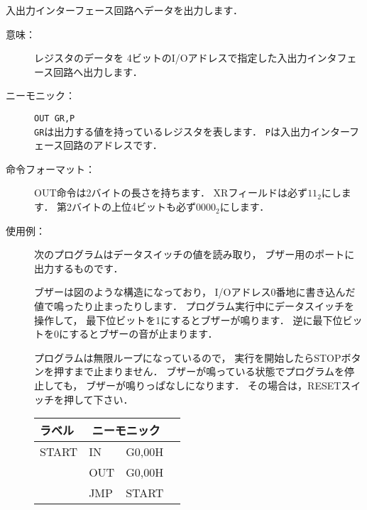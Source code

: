 入出力インターフェース回路へデータを出力します．

\begin{description}
\item[意味：]レジスタのデータを
4ビットのI/Oアドレスで指定した入出力インタフェース回路へ出力します．

\item[ニーモニック：]{\tt OUT  GR,P} \\
{\tt GR}は出力する値を持っているレジスタを表します．
{\tt P}は入出力インターフェース回路のアドレスです．

\item[命令フォーマット：]OUT命令は2バイトの長さを持ちます．
XRフィールドは必ず$11_2$にします．
第2バイトの上位4ビットも必ず$0000_2$にします．


\item[使用例：]
次のプログラムはデータスイッチの値を読み取り，
ブザー用のポートに出力するものです．

ブザーは図のような構造になっており，
I/Oアドレス0番地に書き込んだ値で鳴ったり止まったりします．
プログラム実行中にデータスイッチを操作して，
最下位ビットを1にするとブザーが鳴ります．
逆に最下位ビットを0にするとブザーの音が止まります．

プログラムは無限ループになっているので，
実行を開始したらSTOPボタンを押すまで止まりません．
ブザーが鳴っている状態でプログラムを停止しても，
ブザーが鳴りっぱなしになります．
その場合は，RESETスイッチを押して下さい．

{\tt\small\begin{center}
\begin{tabular}{|l|l l|l}
\cline{1-3}
ラベル & \multicolumn{2}{|c|}{ニーモニック} \\
\hline
START & IN   & G0,00H  \\
      & OUT  & G0,00H  \\
      & JMP  & START   \\ 
\hline
\end{tabular}
\end{center}}

\begin{center}
\end{center}

\end{description}

\vfill
